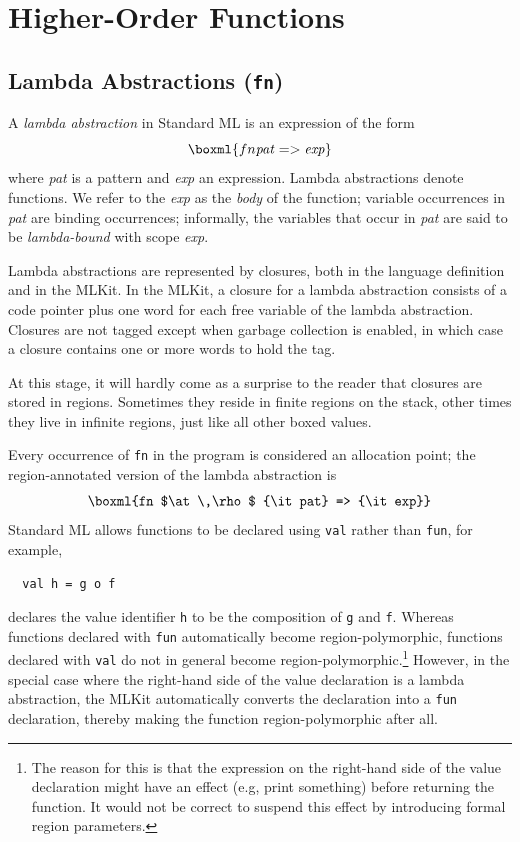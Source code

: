 \documentclass[12pt]{book}
\begin{document}
\chapter{Higher-Order Functions}
\label{hof.sec}

\section{Lambda Abstractions (\texttt{fn})}
A {\em lambda abstraction\/}
%
%
in Standard ML is an expression of the form
$$\boxml{fn {\it pat} => {\it exp}}$$
where {\it pat\/} is a pattern
and {\it exp\/} an expression.  Lambda abstractions denote functions.
We refer to the {\it exp\/} as the {\em body\/} of the function;
variable occurrences in {\it pat\/} are binding occurrences;
informally, the variables that occur in {\it pat\/} are said to be
%
{\em lambda-bound\/} with scope {\it exp}.

Lambda abstractions are represented by closures, both in the language
definition and in the MLKit. In the MLKit, a closure for a lambda
abstraction consists of a code pointer plus one word for each free
variable of the lambda abstraction. Closures are not tagged except
when garbage collection is enabled, in which case a closure contains
one or more words to hold the tag.

At this stage, it will hardly come as a surprise to the reader that
closures are stored in regions.  Sometimes they reside in finite
regions on the stack, other times they live in infinite regions, just
like all other boxed values.

Every occurrence of {\tt fn}
%
in the program is considered an allocation point; the region-annotated
version of the lambda abstraction is
$$\boxml{fn $\at\,\rho$ {\it pat} => {\it exp}}$$
Standard ML allows
functions to be declared using {\tt val} rather than {\tt fun}, for
example,
\begin{verbatim}
  val h = g o f
\end{verbatim}
declares the value identifier {\tt h} to be the composition of {\tt g}
and {\tt f}.  Whereas functions declared with
%
{\tt fun} automatically become region-polymorphic, functions
declared with
%
{\tt val} do not in general become
%
region-polymorphic.\footnote{The reason for this is that the
  expression on the right-hand side of the value declaration might
  have an effect (e.g, print something) before returning the function.
  It would not be correct to suspend this effect by introducing formal
  region parameters.} However, in the special case where the
right-hand side of the value declaration is a
%
lambda abstraction, the MLKit automatically converts the declaration
into a {\tt fun} declaration, thereby making the function
region-polymorphic after all.
\end{document}
